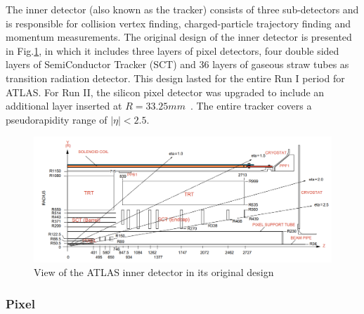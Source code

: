 \label{sec:detector-id}

The inner detector (also known as the tracker) consists of three sub-detectors and is responsible for collision vertex finding, charged-particle trajectory finding and momentum measurements. The original design of the inner detector is presented in Fig.\ref{fig:detector-id}, in which it includes three layers of pixel detectors, four double sided layers of SemiConductor Tracker (SCT) and 36 layers of gaseous straw tubes as transition radiation detector. This design lasted for the entire Run I period for ATLAS. For Run II, the silicon pixel detector was upgraded to include an additional layer inserted at $R=33.25mm$~\cite{CERN-LHCC-2010-013}. The entire tracker covers a pseudorapidity range of $|\eta|<2.5$.


\begin{figure}[htpb!]
\begin{center}
  \includegraphics[width=0.9\linewidth]{figures/detector/ID}
\caption{View of the ATLAS inner detector in its original design\cite{IBLProd} }
\label{fig:detector-id}
\end{center}
\end{figure}



\subsubsection{Pixel}

